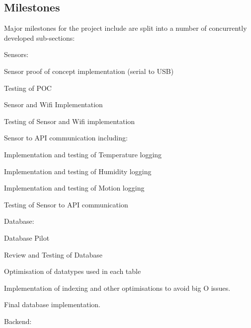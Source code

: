 \documentclass{article}
\begin{document}
        \subsection{Milestones}
            Major milestones for the project include are split into a number of 
            concurrently developed sub-sections:
            \\
            \begin{legal}
                \item Sensors:
                \begin{legal}
                    \item Sensor proof of concept implementation (serial to USB)
                    \item Testing of POC
                    \item Sensor and Wifi Implementation
                    \item Testing of Sensor and Wifi implementation
                    \item Sensor to API communication including:
                    \begin{legal}
                        \item Implementation and testing of Temperature logging
                        \item Implementation and testing of Humidity logging
                        \item Implementation and testing of Motion logging
                        \item Testing of Sensor to API communication
                    \end{legal}
                \end{legal}
                \item Database:
                \begin{legal}
                    \item Database Pilot
                    \item Review and Testing of Database
                    \item Optimisation of datatypes used in each table
                    \item Implementation of indexing and other optimisations to avoid big O issues.
                    \item Final database implementation.
                \end{legal}
                \item Backend:
                \begin{legal}

\end{legal}
\end{legal}
\end{document}
